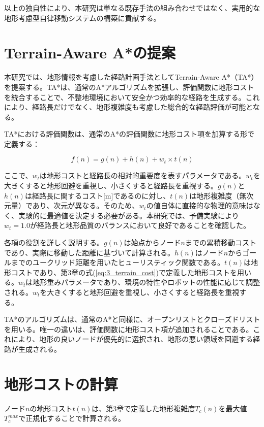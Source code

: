 以上の独自性により、本研究は単なる既存手法の組み合わせではなく、実用的な地形考慮型自律移動システムの構築に貢献する。

\section{Terrain-Aware A*の提案}

本研究では、地形情報を考慮した経路計画手法としてTerrain-Aware A*（TA*）を提案する。TA*は、通常のA*アルゴリズムを拡張し、評価関数に地形コストを統合することで、不整地環境において安全かつ効率的な経路を生成する。これにより、経路長だけでなく、地形複雑度も考慮した総合的な経路評価が可能となる。

TA*における評価関数は、通常のA*の評価関数に地形コスト項を加算する形で定義する：

\begin{equation}
f(n) = g(n) + h(n) + w_t \times t(n)
\label{eq:4_ta_astar}
\end{equation}

ここで、$w_t$は地形コストと経路長の相対的重要度を表すパラメータである。$w_t$を大きくすると地形回避を重視し、小さくすると経路長を重視する。$g(n)$と$h(n)$は経路長に関するコスト[m]であるのに対し、$t(n)$は地形複雑度（無次元量）であり、次元が異なる。そのため、$w_t$の値自体に直接的な物理的意味はなく、実験的に最適値を決定する必要がある。本研究では、予備実験により$w_t = 1.0$が経路長と地形品質のバランスにおいて良好であることを確認した。

各項の役割を詳しく説明する。$g(n)$は始点からノード$n$までの累積移動コストであり、実際に移動した距離に基づいて計算される。$h(n)$はノード$n$からゴールまでのユークリッド距離を用いたヒューリスティック関数である。$t(n)$は地形コストであり、第3章の式(\ref{eq:3_terrain_cost})で定義した地形コストを用いる。$w_t$は地形重みパラメータであり、環境の特性やロボットの性能に応じて調整される。$w_t$を大きくすると地形回避を重視し、小さくすると経路長を重視する。

TA*のアルゴリズムは、通常のA*と同様に、オープンリストとクローズドリストを用いる。唯一の違いは、評価関数に地形コスト項が追加されることである。これにより、地形の良いノードが優先的に選択され、地形の悪い領域を回避する経路が生成される。

\section{地形コストの計算}

ノード$n$の地形コスト$t(n)$は、第3章で定義した地形複雑度$T_c(n)$を最大値$T_c^{max}$で正規化することで計算される。

